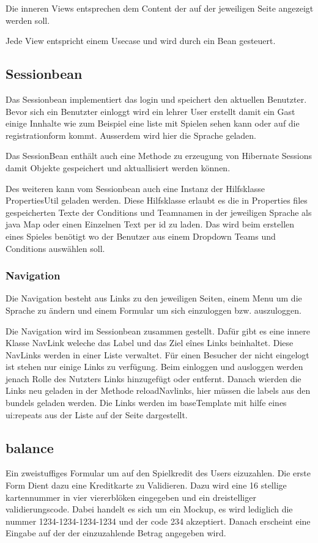 \documentclass[a4paper, abstracton]{scrartcl}
\begin{document}
  Die inneren Views entsprechen dem Content der auf der jeweiligen Seite
  angezeigt werden soll.
  
  Jede View entspricht einem Usecase und wird durch ein Bean gesteuert.


\subsection{Sessionbean}
  Das Sessionbean implementiert das login und speichert den aktuellen Benutzter.
  Bevor sich ein Benutzter einloggt wird ein lehrer User erstellt damit ein Gast
  einige Innhalte wie zum Beispiel eine liste mit Spielen sehen kann oder auf die
  registrationform kommt.
  Ausserdem wird hier die Sprache geladen.
  
  Das SessionBean enthält auch eine Methode zu erzeugung von Hibernate Sessions
  damit Objekte gespeichert und aktuallisiert werden können.
  
  Des weiteren kann vom Sessionbean auch eine Instanz der Hilfsklasse PropertiesUtil
  geladen werden. Diese Hilfsklasse erlaubt es die in Properties files gespeicherten
  Texte der Conditions und Teamnamen in der jeweiligen Sprache als java Map 
  oder einen Einzelnen Text per id zu laden.
  Das wird beim erstellen eines Spieles benötigt wo der Benutzer aus einem Dropdown
  Teams und Conditions auswählen soll.
  
\subsubsection{Navigation}
  Die Navigation besteht aus Links zu den jeweiligen Seiten, einem Menu um die
  Sprache zu ändern und einem Formular um sich einzuloggen bzw. auszuloggen.
  
  Die Navigation wird im Sessionbean zusammen gestellt. Dafür gibt es eine innere
  Klasse NavLink weleche das Label und das Ziel eînes Links beinhaltet.
  Diese NavLinks werden in einer Liste verwaltet. Für einen Besucher der nicht
  eingelogt ist stehen nur einige Links zu verfügung. Beim einloggen und ausloggen
  werden jenach Rolle des Nutzters Links hinzugefügt oder entfernt.
  Danach wierden die Links neu geladen in der Methode reloadNavlinks, hier müssen
  die labels aus den bundels geladen werden.
  Die Links werden im baseTemplate mit hilfe eines ui:repeats aus der Liste auf
  der Seite dargestellt.

\subsection{balance}
  Ein zweistuffiges Formular um auf den Spielkredit des Users eizuzahlen.
  Die erste Form Dient dazu eine Kreditkarte zu Validieren.
  Dazu wird eine 16 stellige kartennummer in vier viererblöken eingegeben
  und ein dreistelliger validierungscode.
  Dabei handelt es sich um ein Mockup, es wird lediglich die nummer
  1234-1234-1234-1234 und der code 234 akzeptiert.
  Danach erscheint eine Eingabe auf der der einzuzahlende Betrag angegeben wird. 
\end{document}
